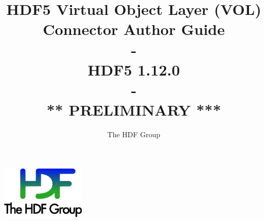 \documentclass[10pt,a4paper]{article}
\title{HDF5 Virtual Object Layer (VOL) Connector Author Guide\\
    -\\
    \large HDF5 1.12.0\\
    -\\
    \large *** PRELIMINARY ***}
\author{The HDF Group}
\begin{document}
\maketitle
\thispagestyle{empty}

\vfill
\begin{center}
\includegraphics[width=4cm]{THG_LOGO.pdf} %
\end{center}
\vfill
\vfill

\newpage
{}
\tableofcontents
\newpage


\renewcommand\appendixtocname{Appendix}









\end{document}
